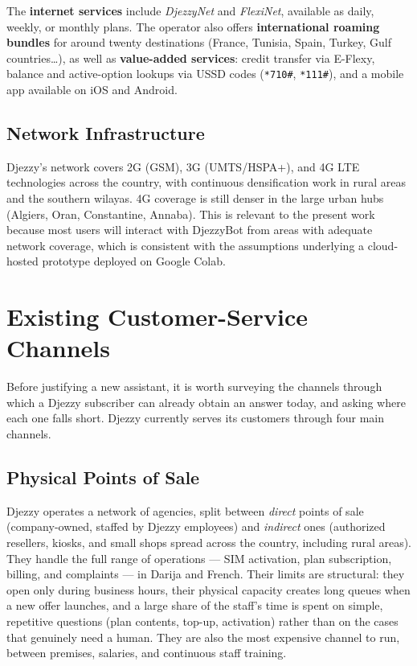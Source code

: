 \documentclass[12pt, a4paper]{report}
\newcommand{\sourced}[1]{#1}        %
\newcommand{\humantext}[1]{#1}      %
\begin{document}
\sourced{The \textbf{internet services} include \textit{DjezzyNet} and \textit{FlexiNet}, available as daily, weekly, or monthly plans. The operator also offers \textbf{international roaming bundles} for around twenty destinations (France, Tunisia, Spain, Turkey, Gulf countries\ldots), as well as \textbf{value-added services}: credit transfer via E-Flexy, balance and active-option lookups via USSD codes (\texttt{*710\#}, \texttt{*111\#}), and a mobile app available on iOS and Android.}

\subsection{Network Infrastructure}

\sourced{Djezzy's network covers 2G (GSM), 3G (UMTS/HSPA+), and 4G LTE technologies across the country, with continuous densification work in rural areas and the southern wilayas. 4G coverage is still denser in the large urban hubs (Algiers, Oran, Constantine, Annaba).} \humantext{This is relevant to the present work because most users will interact with DjezzyBot from areas with adequate network coverage, which is consistent with the assumptions underlying a cloud-hosted prototype deployed on Google Colab.}


\section{Existing Customer-Service Channels}

\humantext{Before justifying a new assistant, it is worth surveying the channels through which a Djezzy subscriber can already obtain an answer today, and asking where each one falls short. Djezzy currently serves its customers through four main channels.}

\subsection{Physical Points of Sale}
\humantext{Djezzy operates a network of agencies, split between \emph{direct} points of sale (company-owned, staffed by Djezzy employees) and \emph{indirect} ones (authorized resellers, kiosks, and small shops spread across the country, including rural areas). They handle the full range of operations --- SIM activation, plan subscription, billing, and complaints --- in Darija and French. Their limits are structural: they open only during business hours, their physical capacity creates long queues when a new offer launches, and a large share of the staff's time is spent on simple, repetitive questions (plan contents, top-up, activation) rather than on the cases that genuinely need a human. They are also the most expensive channel to run, between premises, salaries, and continuous staff training.}
\end{document}

